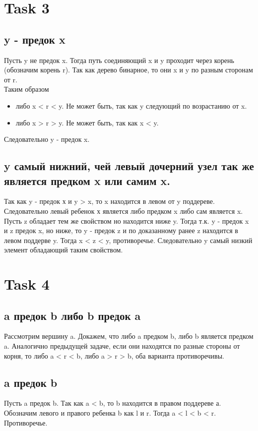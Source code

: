 \documentclass[12pt]{exam}
\begin{document}
\section*{Task 3} 
\subsection*{y - предок x}
Пусть y не предок x. Тогда путь соединяющий x и y проходит через корень (обозначим корень r). 
Так как дерево бинарное, то они x и y по разным сторонам от r. \\
Таким образом 
\begin{itemize}
    \item либо x < r < y. Не может быть, так как y следующий по возрастанию от x.
    \item либо x > r > y. Не может быть, так как x < y.
\end{itemize}
Следовательно y - предок x.

\subsection*{y самый нижний, чей левый дочерний узел так же является предком x или самим x.}
Так как y - предок х и y > x, то x находится в левом от y поддереве. 
Следовательно левый ребенок х является либо предком x либо сам является x.\\
Пусть z обладает тем же свойством но находится ниже y. 
Тогда т.к. y - предок x и z предок x, но ниже, то y - предок z и по доказанному ранее 
z находится в левом поддерве y. Тогда x < z < y, противоречье.
Следовательно y самый низкий элемент обладающий таким свойством.

\section*{Task 4}
\subsection*{a предок b либо b предок a}
Рассмотрим вершину a. 
Докажем, что либо a предком b, либо b является предком a.
Аналогично предыдущей задаче, если они находятся по разные стороны от корня, то 
либо a < r < b, либо a > r > b, оба варианта противоречивы.
\subsection*{a предок b}
Пусть a предок b. 
Так как a < b, то b находится в правом поддереве а. 
Обозначим левого и правого ребенка b как l и r. 
Тогда a < l < b < r. Противоречье.
\end{document}
